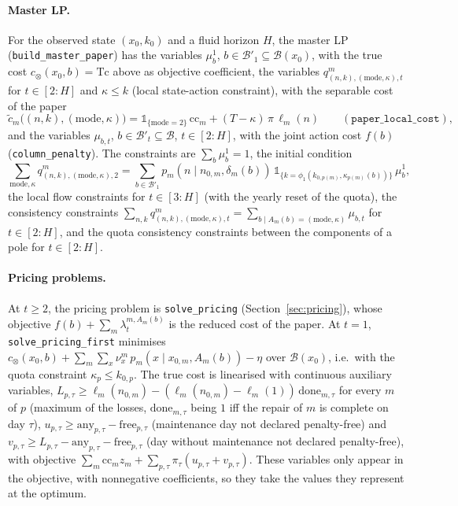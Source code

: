 \documentclass[11pt]{article}
\begin{document}
\paragraph{Master LP.} For the observed state $(x_0, k_0)$ and a fluid horizon $H$, the master
LP (\texttt{build\_master\_paper}) has the variables $\mu^1_b$, $b \in \mathcal B'_1 \subseteq
\mathcal B(x_0)$, with the true cost $c_\otimes(x_0, b) = \mathrm{Tc}$ above as objective
coefficient, the variables $q^m_{(n,k),(\mathrm{mode},\kappa),t}$ for $t \in [2:H]$ and
$\kappa \le k$ (local state-action constraint), with the separable cost of the paper
\[
  \tilde c_m\big((n,k),(\mathrm{mode},\kappa)\big) = \mathbb 1_{\{\mathrm{mode} = 2\}}\,\mathrm{cc}_m
  + (T - \kappa)\,\pi\,\ell_m(n)
  \qquad (\texttt{paper\_local\_cost}),
\]
and the variables $\mu_{b,t}$, $b \in \mathcal B'_t \subseteq \mathcal B$, $t \in [2:H]$, with the
joint action cost $f(b)$ (\texttt{column\_penalty}). The constraints are $\sum_b \mu^1_b = 1$,
the initial condition
\[
  \sum_{\mathrm{mode},\kappa} q^m_{(n,k),(\mathrm{mode},\kappa),2}
  = \sum_{b \in \mathcal B'_1} p_m(n \mid n_{0,m}, \delta_m(b))\,
    \mathbb 1_{\{k = \phi_1(k_{0,p(m)}, \kappa_{p(m)}(b))\}}\, \mu^1_b,
\]
the local flow constraints for $t \in [3:H]$ (with the yearly reset of the quota), the
consistency constraints $\sum_{n,k} q^m_{(n,k),(\mathrm{mode},\kappa),t} = \sum_{b \mid A_m(b) =
(\mathrm{mode},\kappa)} \mu_{b,t}$ for $t \in [2:H]$, and the quota consistency constraints
between the components of a pole for $t \in [2:H]$.

\paragraph{Pricing problems.} At $t \ge 2$, the pricing problem is \texttt{solve\_pricing}
(Section~\ref{sec:pricing}), whose objective $f(b) + \sum_m \lambda_t^{m,A_m(b)}$ is the reduced
cost of the paper. At $t = 1$, \texttt{solve\_pricing\_first} minimises $c_\otimes(x_0, b) +
\sum_m \sum_x \nu^m_x\, p_m(x \mid x_{0,m}, A_m(b)) - \eta$ over $\mathcal B(x_0)$, i.e.\ with
the quota constraint $\kappa_p \le k_{0,p}$. The true cost is linearised with continuous
auxiliary variables, $L_{p,\tau} \ge \ell_m(n_{0,m}) - (\ell_m(n_{0,m}) - \ell_m(1))\,
\mathrm{done}_{m,\tau}$ for every $m$ of $p$ (maximum of the losses, $\mathrm{done}_{m,\tau}$
being $1$ iff the repair of $m$ is complete on day $\tau$), $u_{p,\tau} \ge \mathrm{any}_{p,\tau}
- \mathrm{free}_{p,\tau}$ (maintenance day not declared penalty-free) and $v_{p,\tau} \ge
L_{p,\tau} - \mathrm{any}_{p,\tau} - \mathrm{free}_{p,\tau}$ (day without maintenance not declared
penalty-free), with objective $\sum_m \mathrm{cc}_m z_m + \sum_{p,\tau} \pi_\tau (u_{p,\tau} +
v_{p,\tau})$. These variables only appear in the objective, with nonnegative coefficients, so
they take the values they represent at the optimum.
\end{document}
